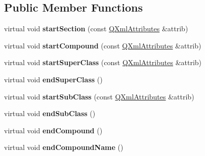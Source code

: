 \subsection*{Public Member Functions}
\begin{DoxyCompactItemize}
\item 
\mbox{\label{class_compound_handler_ae312a5c3352e9feccb8f31c04644331d}} 
virtual void {\bfseries start\+Section} (const \mbox{\hyperlink{class_q_xml_attributes}{Q\+Xml\+Attributes}} \&attrib)
\item 
\mbox{\label{class_compound_handler_a2f898580dc874e0b3feb2a44585ca7b8}} 
virtual void {\bfseries start\+Compound} (const \mbox{\hyperlink{class_q_xml_attributes}{Q\+Xml\+Attributes}} \&attrib)
\item 
\mbox{\label{class_compound_handler_a8fd0c8e7cf8423447ee429cfe09e596c}} 
virtual void {\bfseries start\+Super\+Class} (const \mbox{\hyperlink{class_q_xml_attributes}{Q\+Xml\+Attributes}} \&attrib)
\item 
\mbox{\label{class_compound_handler_a3f4b5ca118ba0203e419fbc1118898f4}} 
virtual void {\bfseries end\+Super\+Class} ()
\item 
\mbox{\label{class_compound_handler_ada50dbe513b9110ee8eb7980f5ef4295}} 
virtual void {\bfseries start\+Sub\+Class} (const \mbox{\hyperlink{class_q_xml_attributes}{Q\+Xml\+Attributes}} \&attrib)
\item 
\mbox{\label{class_compound_handler_a3516537c3eb29cf31fcf28f54714c7d2}} 
virtual void {\bfseries end\+Sub\+Class} ()
\item 
\mbox{\label{class_compound_handler_aff575ded1bcc312bdc61c4ca8a156575}} 
virtual void {\bfseries end\+Compound} ()
\item 
\mbox{\label{class_compound_handler_af66d0f53471552df4c60d0f0f82d3ce7}} 
virtual void {\bfseries end\+Compound\+Name} ()
\item 
\mbox{\label{class_compound_handler_a44420765335442b119e2b65a219483d5}} 

\end{DoxyCompactItemize}
